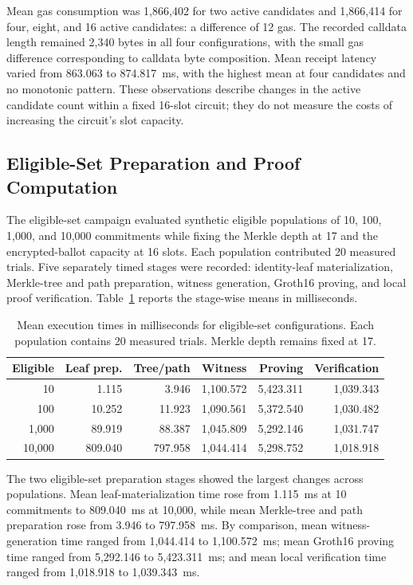 Mean gas consumption was 1,866,402 for two active candidates and 1,866,414 for four, eight, and 16 active candidates: a difference of 12 gas. The recorded calldata length remained 2,340 bytes in all four configurations, with the small gas difference corresponding to calldata byte composition. Mean receipt latency varied from 863.063 to 874.817~ms, with the highest mean at four candidates and no monotonic pattern. These observations describe changes in the active candidate count within a fixed 16-slot circuit; they do not measure the costs of increasing the circuit's slot capacity.

\subsection{Eligible-Set Preparation and Proof Computation}
\label{subsec:results-eligible-set}

The eligible-set campaign evaluated synthetic eligible populations of 10, 100, 1,000, and 10,000 commitments while fixing the Merkle depth at 17 and the encrypted-ballot capacity at 16 slots. Each population contributed 20 measured trials. Five separately timed stages were recorded: identity-leaf materialization, Merkle-tree and path preparation, witness generation, Groth16 proving, and local proof verification. Table~\ref{tab:results-eligible-set} reports the stage-wise means in milliseconds.

\begin{table}[t]
\centering
\caption{Mean execution times in milliseconds
for eligible-set configurations.
Each population contains 20 measured trials.
Merkle depth remains fixed at 17.}
\label{tab:results-eligible-set}
\scriptsize
\setlength{\tabcolsep}{4pt}
\begin{tabular}{@{}rrrrrr@{}}
\toprule
\textbf{Eligible} &
\textbf{Leaf prep.} &
\textbf{Tree/path} &
\textbf{Witness} &
\textbf{Proving} &
\textbf{Verification} \\
\midrule
10
& 1.115
& 3.946
& 1,100.572
& 5,423.311
& 1,039.343 \\
100
& 10.252
& 11.923
& 1,090.561
& 5,372.540
& 1,030.482 \\
1,000
& 89.919
& 88.387
& 1,045.809
& 5,292.146
& 1,031.747 \\
10,000
& 809.040
& 797.958
& 1,044.414
& 5,298.752
& 1,018.918 \\
\bottomrule
\end{tabular}
\end{table}

The two eligible-set preparation stages showed the largest changes across populations. Mean leaf-materialization time rose from 1.115~ms at 10 commitments to 809.040~ms at 10,000, while mean Merkle-tree and path preparation rose from 3.946 to 797.958~ms. By comparison, mean witness-generation time ranged from 1,044.414 to 1,100.572~ms; mean Groth16 proving time ranged from 5,292.146 to 5,423.311~ms; and mean local verification time ranged from 1,018.918 to 1,039.343~ms.

